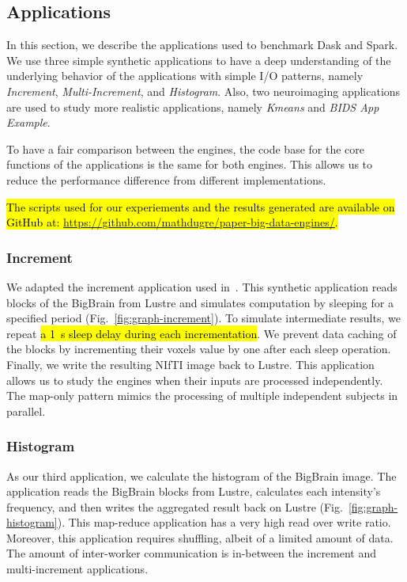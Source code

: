 \documentclass[AMA,STIX1COL]{WileyNJD-v2}
\newcommand{\HL}[1]{\hl{#1}}
\begin{document}
\subsection{Applications}
In this section, we describe the applications used to benchmark Dask and Spark.
We use three simple synthetic applications to have a deep understanding of the 
underlying behavior of the applications with simple I/O patterns, namely
\textit{Increment}, \textit{Multi-Increment}, and \textit{Histogram}.
Also, two neuroimaging applications are used to study more realistic 
applications, namely \textit{Kmeans} and \textit{BIDS App Example}\HL{{\cite{gorgolewski2017bids}}}.
				
To have a fair comparison between the engines, the code base for the core functions of the applications is the same for both engines.
This allows us to reduce the performance difference from different implementations.
		
\HL{The scripts used for our experiements and the results generated are available on
	GitHub at: \mbox{\href{https://github.com/mathdugre/paper-big-data-engines}{https://github.com/mathdugre/paper-big-data-engines/}}.}
		
\subsubsection{Increment}
We adapted the increment application used in~\cite{8752675}.
This synthetic application reads blocks of the BigBrain from Lustre and
simulates computation by sleeping for a specified period (Fig.~\ref{fig:graph-increment}). To simulate
intermediate results, we repeat \HL{a {\SI{1}{\second}} sleep delay during each incrementation}.
We prevent data caching of the blocks by incrementing their voxels
value by one after each sleep operation. Finally, we write the resulting
NIfTI image back to Lustre. This application allows us to study the engines
when their inputs are processed independently. The map-only pattern
mimics the processing of multiple independent subjects in parallel.
							
\subsubsection{Histogram}
As our third application, we calculate the histogram of the BigBrain image. 
The application reads the BigBrain blocks from Lustre, calculates each intensity's frequency, and then writes the aggregated result back on Lustre (Fig.~\ref{fig:graph-histogram}).
This map-reduce application has a very high read over write ratio.
Moreover, this application requires shuffling, albeit of a limited amount of data. 
The amount of inter-worker communication is in-between the increment and multi-increment applications.
				
\end{document}

